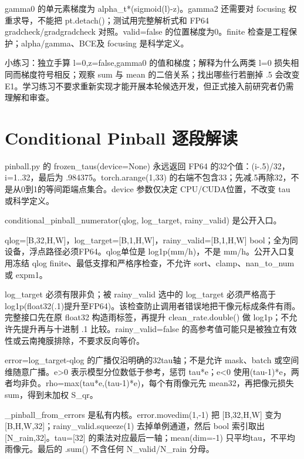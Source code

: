 \documentclass[UTF8,fontset=fandol,10pt]{ctexart}
\begin{document}
gamma0 的单元素梯度为 alpha\_\allowbreak{}t*(sigmoid(l)-z)。gamma2 还需要对 focusing 权重求导，不能把 pt.detach()；测试用完整解析式和 FP64 gradcheck/\allowbreak{}gradgradcheck 对照。valid=false 的位置梯度为0。finite 检查是工程保护；alpha/\allowbreak{}gamma、BCE及 focusing 是科学定义。

小练习：独立手算 l=0,z=false,gamma0 的值和梯度；解释为什么两类 l=0 损失相同而梯度符号相反；观察 sum 与 mean 的二倍关系；找出哪些行若删掉 .5 会改变 E1。学习练习不要求重新实现才能开展本轮候选开发，但正式接入前研究者仍需理解和审查。
\clearpage\section{Conditional Pinball 逐段解读}

pinball.py 的 frozen\_\allowbreak{}taus(device=None) 永远返回 FP64 的32个值：(i-.5)/\allowbreak{}32，i=1..32，最后为 .984375。torch.arange(1,33) 的右端不包含33；先减.5再除32，不是从0到1的等间距端点集合。device 参数仅决定 CPU/\allowbreak{}CUDA位置，不改变 tau 或科学定义。

conditional\_\allowbreak{}pinball\_\allowbreak{}numerator(qlog, log\_\allowbreak{}target, rainy\_\allowbreak{}valid) 是公开入口。

qlog=[B,32,H,W]，log\_\allowbreak{}target=[B,1,H,W]，rainy\_\allowbreak{}valid=[B,1,H,W] bool；全为同设备，浮点路径必须FP64。qlog单位是 log1p(mm/\allowbreak{}h)，不是 mm/\allowbreak{}h。公开入口复用冻结 qlog finite、最低支撑和严格序检查，不允许 sort、clamp、nan\_\allowbreak{}to\_\allowbreak{}num 或 expm1。

log\_\allowbreak{}target 必须有限非负；被 rainy\_\allowbreak{}valid 选中的 log\_\allowbreak{}target 必须严格高于 log1p(float32(.1)提升至FP64)。该检查防止调用者错误地把干像元标成条件有雨。完整接口先在原 float32 构造雨标签，再提升 clean\_\allowbreak{}rate.double() 做 log1p；不允许先提升再与十进制 .1 比较。rainy\_\allowbreak{}valid=false 的高参考值可能只是被独立有效性或云南掩膜排除，不要求反向等价。

error=log\_\allowbreak{}target-qlog 的广播仅沿明确的32tau轴；不是允许 mask、batch 或空间维随意广播。e>0 表示模型分位数低于参考，惩罚 tau*e；e<0 使用(tau-1)*e，两者均非负。rho=max(tau*e,(tau-1)*e)，每个有雨像元先 mean32，再把像元损失 sum，得到未加权 S\_\allowbreak{}qr。

\_\allowbreak{}pinball\_\allowbreak{}from\_\allowbreak{}errors 是私有内核。error.movedim(1,-1) 把 [B,32,H,W] 变为 [B,H,W,32]；rainy\_\allowbreak{}valid.squeeze(1) 去掉单例通道，然后 bool 索引取出 [N\_\allowbreak{}rain,32]。tau=[32] 的乘法对应最后一轴；mean(dim=-1) 只平均tau，不平均雨像元。最后的 .sum() 不含任何 N\_\allowbreak{}valid/\allowbreak{}N\_\allowbreak{}rain 分母。
\end{document}
